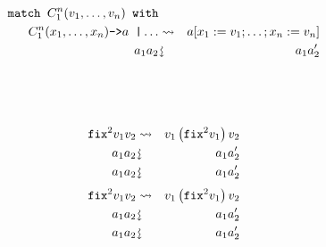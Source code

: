 \documentclass{beamer}
\newcommand{\assign}{:=}
\newcommand{\downsquigarrow}{{\mbox{\rotatebox[origin=c]{-90}{$\rightsquigarrow$}}}}
\newcommand{\tmverbatim}[1]{\text{{\ttfamily{#1}}}}
\begin{document}
\begin{eqnarray*}
  \text{\tmverbatim{match }} C_1^n (v_1, \ldots, v_n) \text{\tmverbatim{
  with}} &  & \\
  C_1^n (x_1, \ldots, x_n) \text{\tmverbatim{->}} a \text{\tmverbatim{
  \textbar }} \ldots & \rightsquigarrow & a [x_1 \assign v_1 ; \ldots ; x_n
  \assign v_n]\\
  a_1 a_2 & \downsquigarrow & a_1 a_2'
\end{eqnarray*}
{\hlstd{ \ }}{}{\hlopt{+ }}{\hlopt{(}}{}{\hlopt{+
}}{\hlopt{(}}{}{\hlopt{(}}{}{}{\hlopt{->}}{\hlendline{}}\\
{\hlstd{ \ \ \ \ \ \ \ \ \ \ \ \ }}{}{}{}{\hlendline{}}\\
{\hlstd{ \ \ \ \ \ \ \ \ \ \ \ \ \ \ }}{\hlopt{\textbar }}{}{\hlopt{-> }}{}{\hlendline{}}\\
{\hlstd{ \ \ \ }}{\hlopt{ \ \ \ \ \ \ \ \ \ \ \textbar }}{}{\hlopt{(}}{}{\hlopt{, }}{}{\hlopt{) -> }}{}{\hlopt{+ }}{}{\hlopt{))}}{}{\hlopt{)}}
\begin{eqnarray*}
  \text{\tmverbatim{fix}}^2 v_1 v_2 & \rightsquigarrow & v_1  \left(
  \text{\tmverbatim{fix}}^2 v_1 \right) v_2\\
  a_1 a_2 & \downsquigarrow & a_1 a_2'\\
  a_1 a_2 & \downsquigarrow & a_1 a_2'
\end{eqnarray*}
{\newpage}
\begin{eqnarray*}
  \text{\tmverbatim{fix}}^2 v_1 v_2 & \rightsquigarrow & v_1  \left(
  \text{\tmverbatim{fix}}^2 v_1 \right) v_2\\
  a_1 a_2 & \downsquigarrow & a_1 a_2'\\
  a_1 a_2 & \downsquigarrow & a_1 a_2'
\end{eqnarray*}
{\hlstd{ \ }}{}{\hlopt{+ }}{\hlopt{(}}{}{\hlopt{+
}}{\hlopt{(}}{}{}{\hlopt{->}}{\hlendline{}}\\
{\hlstd{ \ \ \ \ \ \ \ \ \ \ \ \ }}{}{}{}{\hlendline{}}\\
{\hlstd{ \ \ \ \ \ \ \ \ \ \ \ \ \ \ }}{\hlopt{\textbar }}{}{\hlopt{-> }}{}{\hlendline{}}\\
{\hlstd{ \ \ \ }}{\hlopt{ \ \ \ \ \ \ \ \ \ \ \textbar }}{}{\hlopt{(}}{}{\hlopt{, }}{}{\hlopt{) -> }}{}{\hlopt{+ }}{}{\hlopt{)}}{\hlopt{ }}{\hlopt{(}}{}{\hlopt{(}}{}{}{\hlopt{->}}{\hlendline{}}\\
\end{document}
